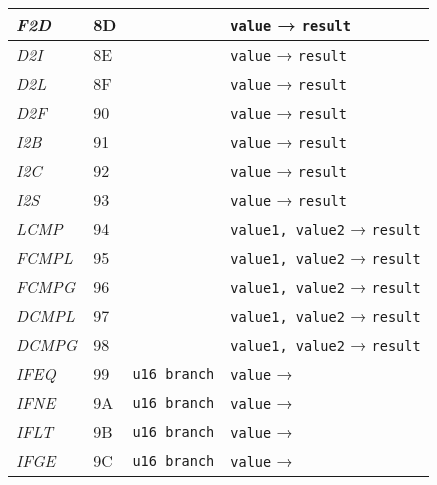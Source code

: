 \begin{center}
\begin{longtable}{ | p{} | p{} | p{} | p{} | }
        \emph{F2D}
		& 8D & & \lstinline|value| → \lstinline|result|
		\\ \hline

        \emph{D2I}
		& 8E & & \lstinline|value| → \lstinline|result|
		\\ \hline

        \emph{D2L}
		& 8F & & \lstinline|value| → \lstinline|result|
		\\ \hline

        \emph{D2F}
		& 90 & & \lstinline|value| → \lstinline|result|
		\\ \hline

        \emph{I2B}
		& 91 & & \lstinline|value| → \lstinline|result|
		\\ \hline

        \emph{I2C}
		& 92 & & \lstinline|value| → \lstinline|result|
		\\ \hline

        \emph{I2S}
		& 93 & & \lstinline|value| → \lstinline|result|
		\\ \hline

        \emph{LCMP}
		& 94 & & \lstinline|value1, value2| → \lstinline|result|
		\\ \hline

        \emph{FCMPL}
		& 95 & & \lstinline|value1, value2| → \lstinline|result|
		\\ \hline

        \emph{FCMPG}
		& 96 & & \lstinline|value1, value2| → \lstinline|result|
		\\ \hline

        \emph{DCMPL}
		& 97 & & \lstinline|value1, value2| → \lstinline|result|
		\\ \hline

        \emph{DCMPG}
		& 98 & & \lstinline|value1, value2| → \lstinline|result|
		\\ \hline

        \emph{IFEQ}
		& 99 & \lstinline|u16 branch| & \lstinline|value| →
		\\ \hline

        \emph{IFNE}
		& 9A & \lstinline|u16 branch| & \lstinline|value| →
		\\ \hline

        \emph{IFLT}
		& 9B & \lstinline|u16 branch| & \lstinline|value| →
		\\ \hline

        \emph{IFGE}
		& 9C & \lstinline|u16 branch| & \lstinline|value| →
		\\ \hline


\end{longtable}
\end{center}
